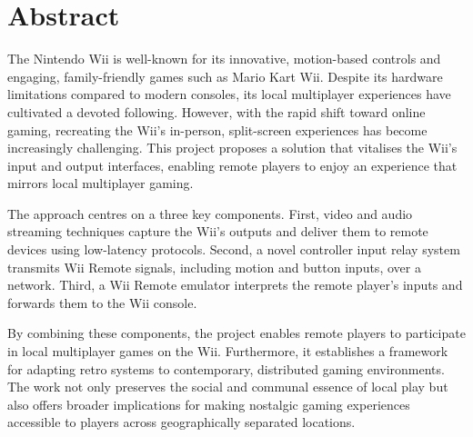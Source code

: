 \chapter*{Abstract}

The Nintendo Wii is well-known for its innovative, motion-based controls and engaging, family-friendly games such as Mario Kart Wii. Despite its hardware limitations compared to modern consoles, its local multiplayer experiences have cultivated a devoted following. However, with the rapid shift toward online gaming, recreating the Wii’s in-person, split-screen experiences has become increasingly challenging. This project proposes a solution that vitalises the Wii’s input and output interfaces, enabling remote players to enjoy an experience that mirrors local multiplayer gaming.

The approach centres on a three key components. First, video and audio streaming techniques capture the Wii’s outputs and deliver them to remote devices using low-latency protocols. Second, a novel controller input relay system transmits Wii Remote signals, including motion and button inputs, over a network. Third, a Wii Remote emulator interprets the remote player’s inputs and forwards them to the Wii console.

By combining these components, the project enables remote players to participate in local multiplayer games on the Wii. Furthermore, it establishes a framework for adapting retro systems to contemporary, distributed gaming environments. The work not only preserves the social and communal essence of local play but also offers broader implications for making nostalgic gaming experiences accessible to players across geographically separated locations.
